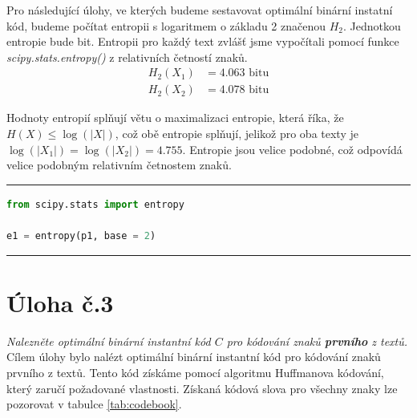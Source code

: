 \documentclass[czech]{mvi-report}
\begin{document}
Pro následující úlohy, ve kterých budeme sestavovat optimální binární instatní kód, budeme počítat entropii s logaritmem o základu 2 značenou $H_2$. Jednotkou entropie bude bit. Entropii pro každý text zvlášť jsme vypočítali pomocí funkce \textit{scipy.stats.entropy()} z relativních četností znaků.
\begin{align*}
  H_2(X_1) &= 4.063 \text{ bitu}\\
  H_2(X_2) &= 4.078 \text{ bitu}
\end{align*}

Hodnoty entropií splňují větu o maximalizaci entropie, která říka, že $H(X) \leq \log(|X|)$, což obě entropie splňují, jelikož pro oba texty je $\log(|X_1|) = \log(|X_2|) = 4.755$. Entropie jsou velice podobné, což odpovídá velice podobným relativním četnostem znaků.

\noindent\rule{\columnwidth}{1pt}
\begin{lstlisting}[language=Python]
from scipy.stats import entropy

e1 = entropy(p1, base = 2)
\end{lstlisting}
\noindent\rule{\columnwidth}{1pt}


\section{Úloha č.3}
\textit{Nalezněte optimální binární instantní kód $C$ pro kódování znaků \textbf{prvního} z textů.}\\

Cílem úlohy bylo nalézt optimální binární instantní kód pro kódování znaků prvního z textů. Tento kód získáme pomocí algoritmu Huffmanova kódování, který zaručí požadované vlastnosti.
Získaná kódová slova pro všechny znaky lze pozorovat v tabulce \ref{tab:codebook}.
\end{document}

